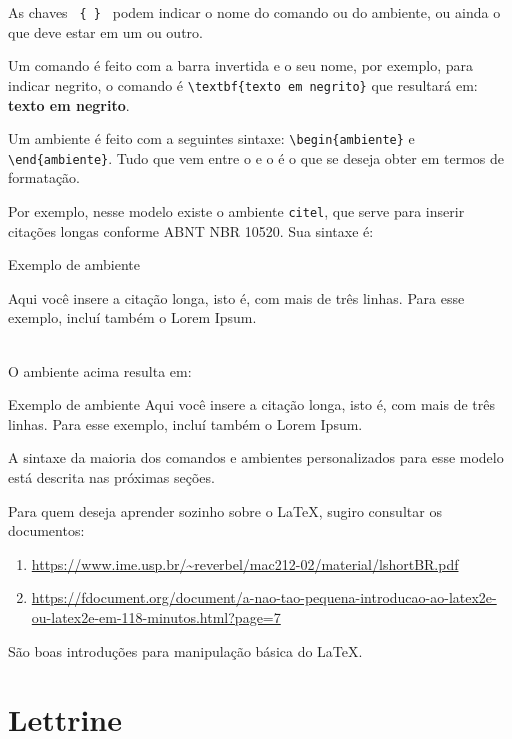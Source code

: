\documentclass[a4paper,12pt,oneside,openright,extrafontsizes,openbib]{memoir}
\begin{document}
{As chaves \verb| { } | podem indicar o nome do comando ou do ambiente, ou ainda o que deve estar em um ou outro.

Um comando é feito com a barra invertida e o seu nome, por exemplo, para indicar negrito, o comando é \verb|\textbf{texto em negrito}| que resultará em: \textbf{texto em negrito}.

Um ambiente é feito com a seguintes sintaxe: \verb|\begin{ambiente}| e \verb|\end{ambiente}|. Tudo que vem entre o  e o  é o que se deseja obter em termos de formatação. 

Por exemplo, nesse modelo existe o ambiente \verb|citel|, que serve para inserir citações longas conforme ABNT NBR 10520. Sua sintaxe é:
\ \\

\begin{codex}{Exemplo de ambiente}
\begin{citel}
Aqui você insere a citação longa, isto é, com mais de três linhas.
Para esse exemplo, incluí também o Lorem Ipsum. \lipsum[1]
\end{citel}
\end{codex}
\ \\

O ambiente acima resulta em:

\begin{citel}{Exemplo de ambiente}
	Aqui você insere a citação longa, isto é, com mais de três linhas. Para esse exemplo, incluí também o Lorem Ipsum. \lipsum[1]
\end{citel}

A sintaxe da maioria dos comandos e ambientes personalizados para esse modelo está descrita nas próximas seções.

Para quem deseja aprender sozinho sobre o \LaTeX, sugiro consultar os documentos:

\begin{enumerate}
	\item \url{https://www.ime.usp.br/~reverbel/mac212-02/material/lshortBR.pdf}
	\item \url{https://fdocument.org/document/a-nao-tao-pequena-introducao-ao-latex2e-ou-latex2e-em-118-minutos.html?page=7}
\end{enumerate}

São boas introduções para manipulação básica do \LaTeX.
\chapter{Lettrine}

}
\end{document}
